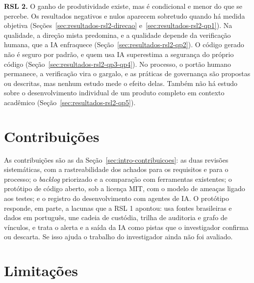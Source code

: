 \textbf{RSL 2.} O ganho de produtividade existe, mas é condicional e menor do
que se percebe. Os resultados negativos e nulos aparecem sobretudo quando há
medida objetiva (Seções~\ref{sec:resultados-rsl2-direcao}
e~\ref{sec:resultados-rsl2-qp1}). Na qualidade, a direção mista predomina, e
a qualidade depende da verificação humana, que a IA enfraquece
(Seção~\ref{sec:resultados-rsl2-qp2}). O código gerado não é seguro por
padrão, e quem usa IA superestima a segurança do próprio código
(Seção~\ref{sec:resultados-rsl2-qp3-qp4}). No processo, o portão humano
permanece, a verificação vira o gargalo, e as práticas de governança são
propostas ou descritas, mas nenhum estudo mede o efeito delas. Também não há
estudo sobre o desenvolvimento individual de um produto completo em contexto
acadêmico (Seção~\ref{sec:resultados-rsl2-qp5}).

\section{Contribuições}
\label{sec:consideracoes-contribuicoes}

As contribuições são as da Seção~\ref{sec:intro-contribuicoes}: as duas
revisões sistemáticas, com a rastreabilidade dos achados para os requisitos
e para o processo; o \textit{backlog} priorizado e a comparação com
ferramentas existentes; o protótipo de código aberto, sob a licença MIT, com
o modelo de ameaças ligado aos testes; e o registro do desenvolvimento com
agentes de IA. O protótipo responde, em parte, a lacunas que a RSL 1 apontou:
usa fontes brasileiras e dados em português, une cadeia de custódia, trilha
de auditoria e grafo de vínculos, e trata o alerta e a saída da IA como
pistas que o investigador confirma ou descarta. Se isso ajuda o trabalho do
investigador ainda não foi avaliado.

\section{Limitações}
\label{sec:consideracoes-limitacoes}


